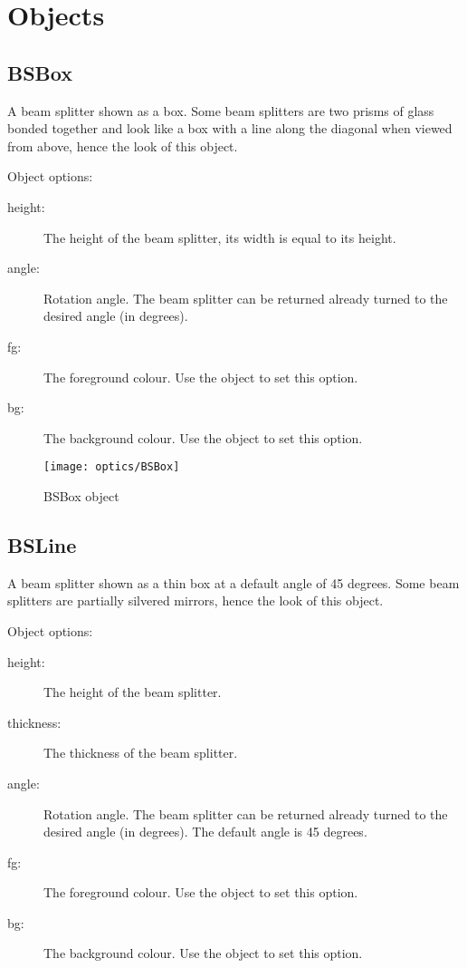 \section{Objects}

\subsection{BSBox}

A beam splitter shown as a box.  Some beam splitters are two prisms of glass
bonded together and look like a box with a line along the diagonal
when viewed from above, hence the look of this object.

Object options:
\begin{description}
\item[height:] The height of the beam splitter, its width is equal to its
height.
\item[angle:] Rotation angle.  The beam splitter can be returned already
turned to the desired angle (in degrees).
\item[fg:] The foreground colour.  Use the  object to set this
option.
\item[bg:] The background colour.  Use the  object to set this
option.
\end{description}

\begin{figure}[ht]
\centerline{\texttt{[image: optics/BSBox]}}
\caption{BSBox object}
\label{fig:bsbox}
\end{figure}

\subsection{BSLine}

A beam splitter shown as a thin box at a default angle of 45 degrees.  Some
beam splitters are partially silvered mirrors, hence the look of this
object.

Object options:
\begin{description}
\item[height:] The height of the beam splitter.
\item[thickness:] The thickness of the beam splitter.
\item[angle:] Rotation angle.  The beam splitter can be returned already
turned to the desired angle (in degrees).  The default angle is 45 degrees.
\item[fg:] The foreground colour.  Use the  object to set this
option.
\item[bg:] The background colour.  Use the  object to set this
option.
\end{description}

